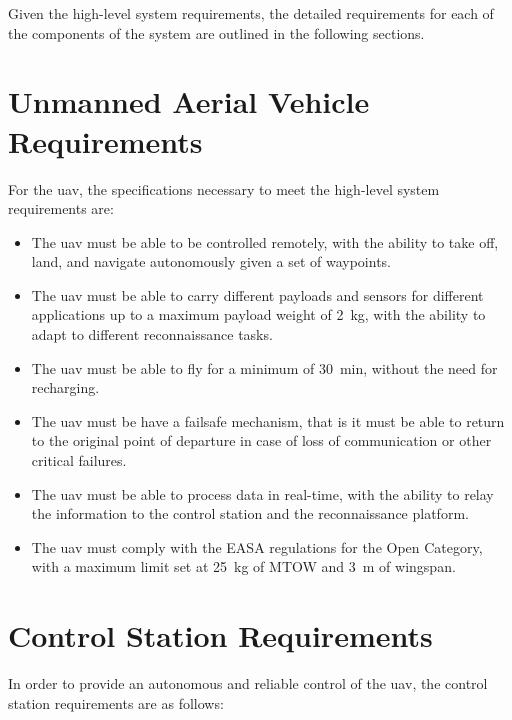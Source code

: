Given the high-level system requirements, the detailed requirements for each of the components of the system are outlined in the following sections.

\section{Unmanned Aerial Vehicle Requirements}

For the \gls{uav}, the specifications necessary to meet the high-level system requirements are:

\begin{itemize}
  \item The \gls{uav} must be able to be controlled remotely, with the ability to take off, land, and navigate autonomously given a set of waypoints.

  \item The \gls{uav} must be able to carry different payloads and sensors for different applications up to a maximum payload weight of \SI{2}{\kilogram}, with the ability to adapt to different reconnaissance tasks.

  \item The \gls{uav} must be able to fly for a minimum of \SI{30}{\minute}, without the need for recharging.

  \item The \gls{uav} must be have a failsafe mechanism, that is it must be able to return to the original point of departure in case of loss of communication or other critical failures.

  \item The \gls{uav} must be able to process data in real-time, with the ability to relay the information to the control station and the reconnaissance platform.

  \item The \gls{uav} must comply with the EASA regulations for the Open Category, with a maximum limit set at \SI{25}{\kilogram} of MTOW and \SI{3}{\meter} of wingspan.
\end{itemize}

\section{Control Station Requirements}

In order to provide an autonomous and reliable control of the \gls{uav}, the control station requirements are as follows:

